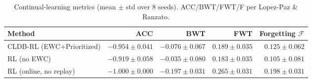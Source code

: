 \begin{table}[t]\centering\small
\caption{Continual-learning metrics (mean $\pm$ std over 8 seeds). ACC/BWT/FWT/F per Lopez-Paz \& Ranzato.}
\label{tab:main}
\begin{tabular}{lrrrr}
\toprule
Method & ACC & BWT & FWT & Forgetting $\mathcal{F}$ \\
\midrule
CLDB-RL (EWC+Prioritized) & $-0.954\pm0.041$ & $-0.076\pm0.067$ & $0.189\pm0.035$ & $0.125\pm0.062$ \\
RL (no EWC) & $-0.919\pm0.058$ & $-0.035\pm0.080$ & $0.183\pm0.035$ & $0.105\pm0.081$ \\
RL (online, no replay) & $-1.000\pm0.000$ & $-0.197\pm0.031$ & $0.265\pm0.031$ & $0.198\pm0.031$ \\
\bottomrule\end{tabular}\end{table}